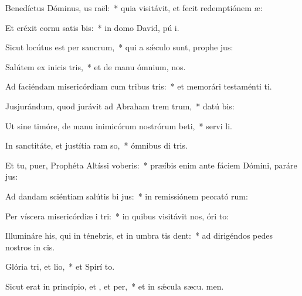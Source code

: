 \item Benedíctus Dóminus, us raël:~* quia visitávit, et fecit redemptiónem  æ:
\item Et eréxit cornu satis bis:~* in domo David, pú i.
\item Sicut locútus est per  sancrum,~* qui a sǽculo sunt, prophe jus:
\item Salútem ex inicis tris,~* et de manu ómnium,   nos.
\item Ad faciéndam misericórdiam cum tribus tris:~* et memorári testaménti  ti.
\item Jusjurándum, quod jurávit ad Abraham trem trum,~* datú  bis:
\item Ut sine timóre, de manu inimicórum nostrórum beti,~* servi li.
\item In sanctitáte, et justítia ram so,~* ómnibus di tris.
\item Et tu, puer, Prophéta Altíssi voberis:~* præíbis enim ante fáciem Dómini, paráre  jus:
\item Ad dandam sciéntiam salútis bi jus:~* in remissiónem peccató rum:
\item Per víscera misericórdiæ i tri:~* in quibus visitávit nos, óri  to:
\item Illumináre his, qui in ténebris, et in umbra tis dent:~* ad dirigéndos pedes nostros in  cis.
\item Glória tri, et lio,~* et Spirí to.
\item Sicut erat in princípio, et , et per,~* et in sǽcula sæcu. men.

